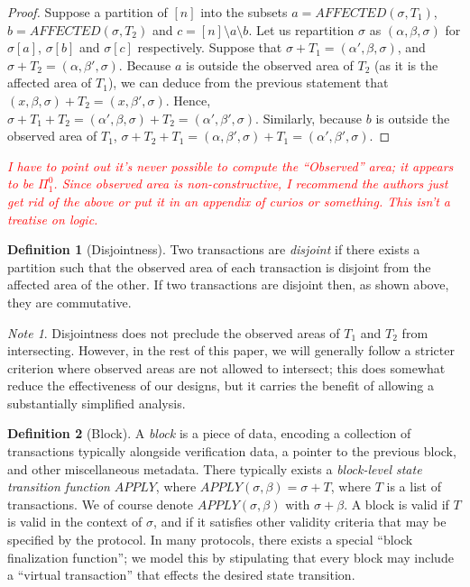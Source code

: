 \documentclass[11pt,a4paper]{report}
\newcommand{\comment}[1]{\textcolor{red}{\textit{#1}}}
\theoremstyle{plain}
\theoremstyle{definition}
\newtheorem{defn}{Definition}[chapter]
\theoremstyle{remark}
\newtheorem*{note}{Note}
\begin{document}
\begin{proof}
Suppose a partition of $[n]$ into the subsets $a = AFFECTED(\sigma, T_1)$, $b = AFFECTED(\sigma, T_2)$ and $c = [n] \setminus a \setminus b$. Let us repartition $\sigma$ as $(\alpha, \beta, \sigma)$ for $\sigma[a]$, $\sigma[b]$ and $\sigma[c]$ respectively. Suppose that $\sigma + T_1 = (\alpha', \beta, \sigma)$, and $\sigma + T_2 = (\alpha, \beta', \sigma)$. Because $a$ is outside the observed area of $T_2$ (as it is the affected area of $T_1$), we can deduce from the previous statement that $(x, \beta, \sigma) + T_2 = (x, \beta', \sigma)$. Hence, $\sigma + T_1 + T_2 = (\alpha', \beta, \sigma) + T_2 = (\alpha', \beta', \sigma)$. Similarly, because $b$ is outside the observed area of $T_1$, $\sigma + T_2 + T_1 = (\alpha, \beta', \sigma) + T_1 = (\alpha', \beta', \sigma)$.
\end{proof}

\comment{I have to point out it's never possible to compute the ``Observed'' area; it appears to be $\Pi^0_1$.  Since observed area is non-constructive, I recommend the authors just get rid of the above or put it in an appendix of curios or something.  This isn't a treatise on logic.}

\begin{defn}[Disjointness]
Two transactions are \emph{disjoint} if there exists a partition such that the observed area of each transaction is disjoint from the affected area of the other. If two transactions are disjoint then, as shown above, they are commutative.
\end{defn}

\begin{note}
Disjointness does not preclude the observed areas of $T_1$ and $T_2$ from intersecting. However, in the rest of this paper, we will generally follow a stricter criterion where observed areas are not allowed to intersect; this does somewhat reduce the effectiveness of our designs, but it carries the benefit of allowing a substantially simplified analysis.
\end{note}

\begin{defn}[Block]
A \emph{block} is a piece of data, encoding a collection of transactions typically alongside verification data, a pointer to the previous block, and other miscellaneous metadata. There typically exists a \emph{block-level state transition function} $APPLY$, where $APPLY(\sigma, \beta) = \sigma + T$, where $T$ is a list of transactions. We of course denote $APPLY(\sigma, \beta)$ with $\sigma + \beta$. A block is valid if $T$ is valid in the context of $\sigma$, and if it satisfies other validity criteria that may be specified by the protocol. In many protocols, there exists a special ``block finalization function''; we model this by stipulating that every block may include a ``virtual transaction'' that effects the desired state transition.
\end{defn}
\end{document}
